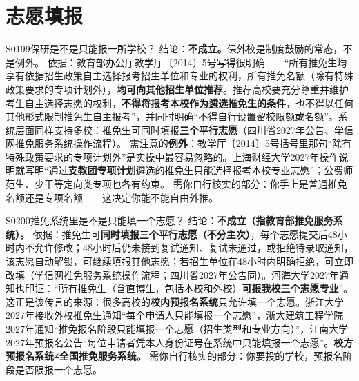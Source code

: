 \section{志愿填报}
\begin{qa}{S0199}{保研是不是只能报一所学校？}
结论：\textbf{不成立。}保外校是制度鼓励的常态，不是例外。
依据：教育部办公厅教学厅〔2014〕5号写得很明确——“所有推免生均享有依据招生政策自主选择报考招生单位和专业的权利，所有推免名额（除有特殊政策要求的专项计划外），\textbf{均可向其他招生单位推荐}。推荐高校要充分尊重并维护考生自主选择志愿的权利，\textbf{不得将报考本校作为遴选推免生的条件}，也不得以任何其他形式限制推免生自主报考”，并同时明确“不得自行设置留校限额或名额”。系统层面同样支持多校：推免生可同时填报\textbf{三个平行志愿}（四川省2027年公告、学信网推免服务系统操作流程）。
需注意的\textbf{例外}：教学厅〔2014〕5号括号里那句“除有特殊政策要求的专项计划外”是实操中最容易忽略的。上海财经大学2027年操作说明就写明“通过\textbf{支教团专项计划}遴选的推免生只能选择报考本校专业志愿”；公费师范生、少干等定向类专项也各有约束。
需你自行核实的部分：你手上是普通推免名额还是专项名额——这决定你能不能自由外推。
\end{qa}

\begin{qa}{S0200}{推免系统里是不是只能填一个志愿？}
结论：\textbf{不成立（指教育部推免服务系统）。}
依据：推免生可\textbf{同时填报三个平行志愿（不分主次）}，每个志愿提交后48小时内不允许修改；48小时后仍未接到复试通知、复试未通过，或拒绝待录取通知，该志愿自动解锁，可继续填报其他志愿；若招生单位在48小时内明确拒绝，可立即改填（学信网推免服务系统操作流程；四川省2027年公告同）。河海大学2027年通知也印证：“所有推免生（含直博生，包括本校和外校）\textbf{可报我校三个志愿专业}”。
这正是该传言的来源：很多高校的\textbf{校内预报名系统}只允许填一个志愿。浙江大学2027年接收外校推免生通知“每个申请人只能填报一个志愿”，浙大建筑工程学院2027年通知“推免报名阶段只能填报一个志愿（招生类型和专业方向）”，江南大学2027年预报名公告“每位申请者凭本人身份证号在系统中只能填报一个志愿”。\textbf{校方预报名系统≠全国推免服务系统。}
需你自行核实的部分：你要投的学校，预报名阶段是否限报一个志愿。
\end{qa}

